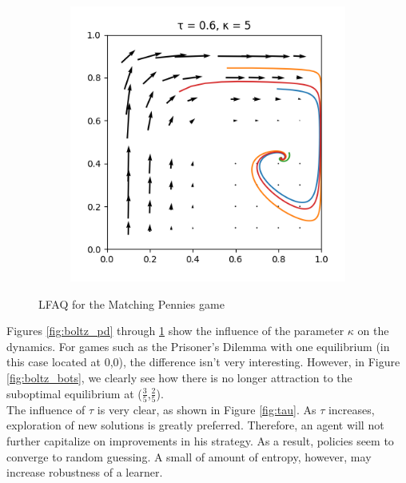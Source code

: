 \documentclass[10pt,a4paper]{article}
\begin{document}
\begin{figure}[h]
\begin{subfigure}[b]{0.30\textwidth}
    \end{subfigure}
    \begin{subfigure}[b]{0.30\textwidth}
        \includegraphics[width=\textwidth]{Figures/boltzmann_mp_5.png}
    \end{subfigure}
    \caption{LFAQ for the Matching Pennies game}
    \label{fig:boltz_mp}
\end{figure}

Figures \ref{fig:boltz_pd} through \ref{fig:boltz_mp} show the influence of the parameter $\kappa$ on the dynamics. For games such as the Prisoner's Dilemma with one equilibrium (in this case located at 0,0), the difference isn't very interesting. However, in Figure \ref{fig:boltz_bots}, we clearly see how there is no longer attraction to the suboptimal equilibrium at ($\frac{3}{5}$,$\frac{2}{5}$).
\\

The influence of $\tau$ is very clear, as shown in Figure \ref{fig:tau}. As $\tau$ increases, exploration of new solutions is greatly preferred. Therefore, an agent will not further capitalize on improvements in his strategy. As a result, policies seem to converge to random guessing. A small of amount of entropy, however, may increase robustness of a learner.
\end{document}
